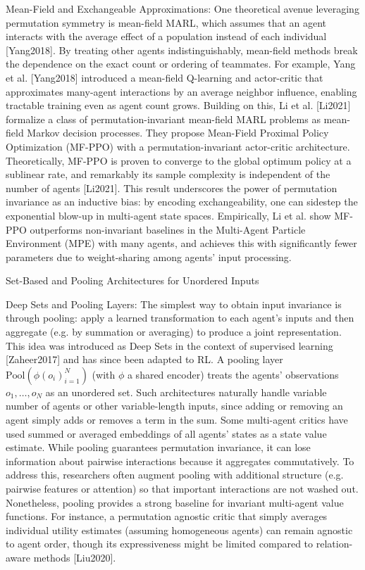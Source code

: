 \documentclass{article}
\begin{document}
Mean-Field and Exchangeable Approximations: 
One theoretical avenue leveraging permutation symmetry is mean-field MARL, 
which assumes that an agent interacts with the average effect of a population 
instead of each individual [Yang2018]. By treating other agents indistinguishably, 
mean-field methods break the dependence on the exact count or ordering of teammates. 
For example, Yang et al. [Yang2018] introduced a mean-field Q-learning and actor-critic 
that approximates many-agent interactions by an average neighbor influence, enabling tractable 
training even as agent count grows. Building on this, Li et al. [Li2021] 
formalize a class of permutation-invariant mean-field MARL problems as 
mean-field Markov decision processes. 
They propose Mean-Field Proximal Policy Optimization (MF-PPO) with a 
permutation-invariant actor-critic architecture. 
Theoretically, MF-PPO is proven to converge to the global optimum 
policy at a sublinear rate, and remarkably its sample complexity is 
independent of the number of agents [Li2021]. This result underscores 
the power of permutation invariance as an inductive bias: by encoding exchangeability, 
one can sidestep the exponential blow-up in multi-agent state spaces. 
Empirically, Li et al. show MF-PPO outperforms non-invariant baselines in the 
Multi-Agent Particle Environment (MPE) with many agents, and achieves this with 
significantly fewer parameters due to weight-sharing among agents' input processing.

Set-Based and Pooling Architectures for Unordered Inputs

Deep Sets and Pooling Layers: The simplest way to obtain input invariance is through pooling: apply a learned transformation to each agent’s inputs and then aggregate (e.g. by summation or averaging) to produce a joint representation. This idea was introduced as Deep Sets in the context of supervised learning [Zaheer2017] and has since been adapted to RL. A pooling layer $\text{Pool}({ \phi(o_i) }_{i=1}^N)$ (with $\phi$ a shared encoder) treats the agents’ observations ${o_1,\dots,o_N}$ as an unordered set. Such architectures naturally handle variable number of agents or other variable-length inputs, since adding or removing an agent simply adds or removes a term in the sum. Some multi-agent critics have used summed or averaged embeddings of all agents’ states as a state value estimate. While pooling guarantees permutation invariance, it can lose information about pairwise interactions because it aggregates commutatively. To address this, researchers often augment pooling with additional structure (e.g. pairwise features or attention) so that important interactions are not washed out. Nonetheless, pooling provides a strong baseline for invariant multi-agent value functions. For instance, a permutation agnostic critic that simply averages individual utility estimates (assuming homogeneous agents) can remain agnostic to agent order, though its expressiveness might be limited compared to relation-aware methods [Liu2020].
\end{document}
